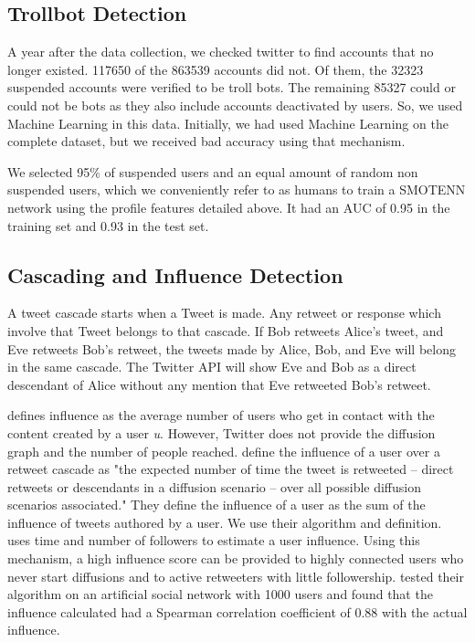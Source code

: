 \documentclass[letterpaper]{article}
\begin{document}
\subsection{Trollbot Detection}
A year after the data collection, we checked twitter to find accounts that no longer existed. 117650 of the 863539
accounts did not. Of them, the 32323 suspended accounts were verified to be troll bots. The remaining 85327 
could or could not be bots as they also include accounts deactivated by users. So, we used Machine Learning in this 
data. Initially, we had used Machine Learning on the complete dataset, but we received bad accuracy using that 
mechanism. \par

We selected 95\% of suspended users and an equal amount of random non suspended users, which we conveniently refer to as humans to train a SMOTENN network using 
the profile features detailed above. It had an AUC of 0.95 in the training set and 0.93 in the test set.


\subsection{Cascading and Influence Detection}
A tweet cascade starts when a Tweet is made. Any retweet or response which involve that Tweet belongs to that cascade. If Bob retweets Alice's tweet, and Eve retweets Bob's retweet, the tweets
made by Alice, Bob, and Eve will belong in the same cascade. The Twitter API will show Eve and Bob as a direct descendant of Alice without any mention that Eve retweeted Bob's retweet. \par

\cite{du2013scalable} defines influence as the average number of users who get in contact with the content created by a user \textit{u}.
 However, Twitter does not provide the diffusion graph and the number of people reached. \cite{rizoiu2018debatenight}
  define the influence of a user over a retweet cascade as "the expected number of time the tweet is
 retweeted – direct retweets or descendants in a diffusion scenario – over all possible diffusion scenarios  
 associated." They define the influence of a user as the sum of the influence of tweets
 authored by a user. We use their algorithm and definition. \cite{rizoiu2018debatenight} uses time and 
 number of followers to estimate a user influence. Using this mechanism, a high influence score can be provided to highly connected users who never start diffusions and 
 to active retweeters with little followership. \cite{rizoiu2018debatenight} tested their algorithm on an artificial social network with 1000 users and found that the influence calculated had a Spearman 
 correlation coefficient of 0.88 with the actual influence. \par 
\end{document}
